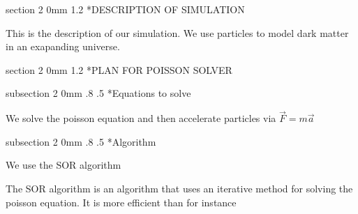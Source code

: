 \documentclass[titlepage, 11pt]{article}
\makeatletter
\renewcommand{\section}{\@startsection
        {section}
        {2}
        {0mm}
        {1.2\baselineskip}
        {\baselineskip}
        {\centering\normalsize}}
\renewcommand{\subsection}{\@startsection
        {subsection}
        {2}
        {0mm}
        {.8\baselineskip}
        {.5\baselineskip}
        {\bfseries\normalsize}}
\makeatother
\begin{document}
%

\section*{DESCRIPTION OF SIMULATION}

This is the description of our simulation. We use particles to model dark
matter in an exapanding universe.

\section*{PLAN FOR POISSON SOLVER}

\subsection*{Equations to solve}

We solve the poisson equation and then accelerate particles via $\vec{F}=m\vec{a}$

\subsection*{Algorithm}

We use the SOR algorithm

The SOR algorithm is an algorithm that uses an iterative method for solving the poisson equation. It is more efficient than for instance 
\end{document}
